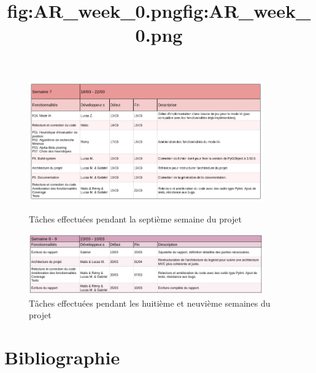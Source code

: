 \documentclass[a4paper,12pt]{article}
\begin{document}
\begin{figure}[h]
    \includegraphics[width=0.9\textwidth]{images/AR_week_07.png}
    \caption{Tâches effectuées pendant la septième semaine du projet}
    \title{fig:AR_week_0.png}

    \vspace{1cm}

    \includegraphics[width=0.9\textwidth]{images/AR_week_08-09.png}
    \caption{Tâches effectuées pendant les huitième et neuvième semaines du projet}
    \title{fig:AR_week_0.png}
\end{figure}

\FloatBarrier

\newpage

\section{Bibliographie}



\end{document}
